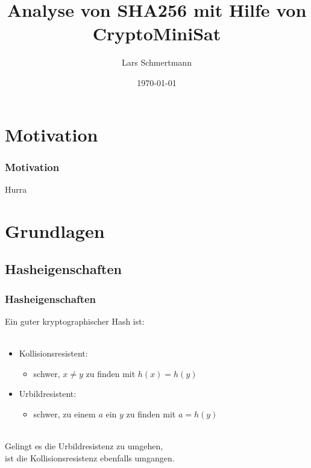 \documentclass{beamer}
\title{Analyse von SHA256 mit Hilfe von CryptoMiniSat}
\author{Lars Schmertmann}
\date{\today}
\begin{document}
\maketitle


\section{Motivation}
  \begin{frame}
    \frametitle{Motivation}
    Hurra
  \end{frame}
\section{Grundlagen}
  \subsection{Hasheigenschaften}
    \begin{frame}
      \frametitle{Hasheigenschaften}
      Ein guter kryptographischer Hash ist:\\
      ~\\
      \begin{itemize}
        \setlength{\itemsep}{20pt}
        \item Kollisionsresistent:
        \begin{itemize}
          \item schwer, $ x \neq y $ zu finden mit $ h(x) = h(y) $
        \end{itemize}
        \item Urbildresistent:
        \begin{itemize}
          \item schwer, zu einem $ a $ ein $ y $ zu finden mit $ a = h(y) $
        \end{itemize}
      \end{itemize}
      ~\\
      Gelingt es die Urbildresistenz zu umgehen,\\
      ist die Kollisionsresistenz ebenfalls umgangen.
    \end{frame}
\end{document}
